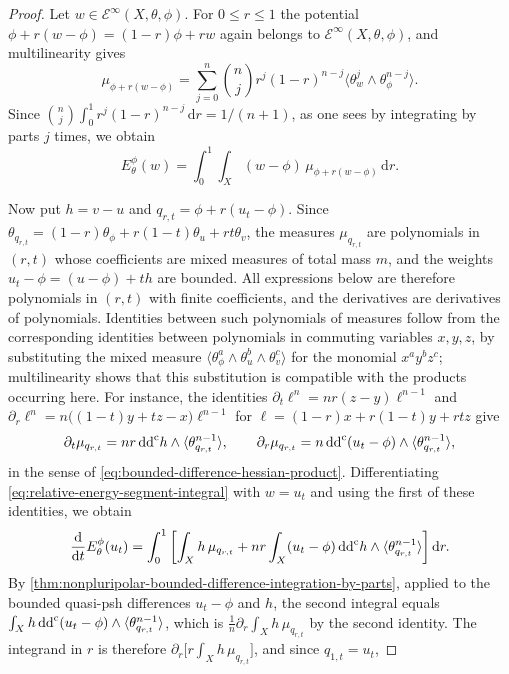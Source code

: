 \begin{proof}
Let $w\in\mathcal E^\infty(X,\theta,\phi)$. For $0\leq r\leq1$ the potential $\phi+r(w-\phi)=(1-r)\phi+rw$ again belongs to $\mathcal E^\infty(X,\theta,\phi)$, and multilinearity gives
\[
 \mu_{\phi+r(w-\phi)}=\sum_{j=0}^n\binom nj r^j(1-r)^{n-j}\langle\theta_w^j\wedge\theta_\phi^{n-j}\rangle.
\]
Since $\binom nj\int_0^1r^j(1-r)^{n-j}\,\mathrm dr=1/(n+1)$, as one sees by integrating by parts $j$ times, we obtain
\begin{equation}\label{eq:relative-energy-segment-integral}
 E_\theta^\phi(w)=\int_0^1\int_X(w-\phi)\,
                              \mu_{\phi+r(w-\phi)}\,\mathrm dr.
\end{equation}

Now put $h=v-u$ and $q_{r,t}=\phi+r(u_t-\phi)$. Since $\theta_{q_{r,t}}=(1-r)\theta_\phi+r(1-t)\theta_u+rt\theta_v$, the measures $\mu_{q_{r,t}}$ are polynomials in $(r,t)$ whose coefficients are mixed measures of total mass $m$, and the weights $u_t-\phi=(u-\phi)+th$ are bounded. All expressions below are therefore polynomials in $(r,t)$ with finite coefficients, and the derivatives are derivatives of polynomials. Identities between such polynomials of measures follow from the corresponding identities between polynomials in commuting variables $x,y,z$, by substituting the mixed measure $\langle\theta_\phi^a\wedge\theta_u^b\wedge\theta_v^c\rangle$ for the monomial $x^ay^bz^c$; multilinearity shows that this substitution is compatible with the products occurring here. For instance, the identities $\partial_t\ell^n=nr(z-y)\ell^{n-1}$ and $\partial_r\ell^n=n\bigl((1-t)y+tz-x\bigr)\ell^{n-1}$ for $\ell=(1-r)x+r(1-t)y+rtz$ give
\begin{equation}\label{eq:bounded-type-measure-derivatives}
 \partial_t\mu_{q_{r,t}}=nr\,\mathrm{dd}^{\mathrm{c}} h\wedge\langle\theta_{q_{r,t}}^{n-1}\rangle,\qquad
 \partial_r\mu_{q_{r,t}}=n\,\mathrm{dd}^{\mathrm{c}}(u_t-\phi)\wedge\langle\theta_{q_{r,t}}^{n-1}\rangle,
\end{equation}
in the sense of \eqref{eq:bounded-difference-hessian-product}. Differentiating \eqref{eq:relative-energy-segment-integral} with $w=u_t$ and using the first of these identities, we obtain
\[
 \frac{\mathrm d}{\mathrm dt}E_\theta^\phi(u_t)
  =\int_0^1\left[\int_Xh\,\mu_{q_{r,t}}
       +nr\int_X(u_t-\phi)\,\mathrm{dd}^{\mathrm{c}} h\wedge
                                      \langle\theta_{q_{r,t}}^{n-1}\rangle\right]\mathrm dr.
\]
By \cref{thm:nonpluripolar-bounded-difference-integration-by-parts}, applied to the bounded quasi-psh differences $u_t-\phi$ and $h$, the second integral equals $\int_Xh\,\mathrm{dd}^{\mathrm{c}}(u_t-\phi)\wedge\langle\theta_{q_{r,t}}^{n-1}\rangle$, which is $\frac1n\partial_r\int_Xh\,\mu_{q_{r,t}}$ by the second identity. The integrand in $r$ is therefore $\partial_r\bigl[r\int_Xh\,\mu_{q_{r,t}}\bigr]$, and since $q_{1,t}=u_t$,

\end{proof}
